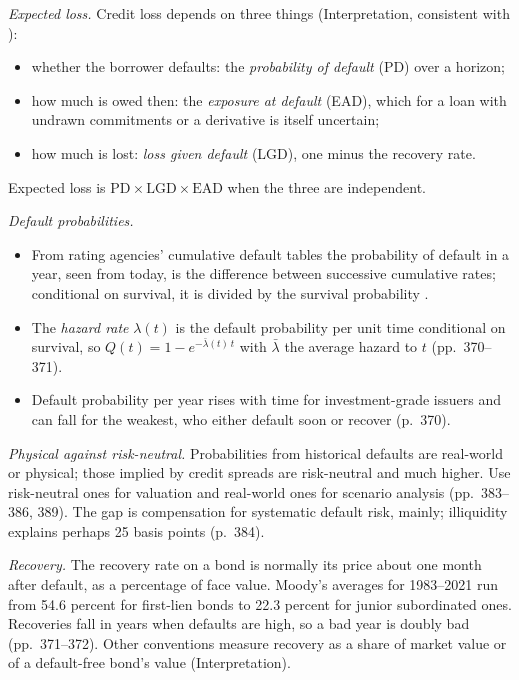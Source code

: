\begin{qfdefinition}\label{def:credit-risk-components}
 \emph{Expected loss.} Credit loss depends on three things (Interpretation, consistent with \citep[pp.~371--372, 395--396]{risk-management-financial-institutions-2023}):
\begin{itemize}
\item whether the borrower defaults: the \emph{probability of default} (PD) over a horizon;
\item how much is owed then: the \emph{exposure at default} (EAD), which for a loan with undrawn commitments or a derivative is itself uncertain;
\item how much is lost: \emph{loss given default} (LGD), one minus the recovery rate.
\end{itemize}
Expected loss is $\mathrm{PD}\times\mathrm{LGD}\times\mathrm{EAD}$ when the three are independent.

\emph{Default probabilities.}
\begin{itemize}
\item From rating agencies' cumulative default tables the probability of default in a year, seen from today, is the difference between successive cumulative rates; conditional on survival, it is divided by the survival probability \citep[pp.~369--370]{risk-management-financial-institutions-2023}.
\item The \emph{hazard rate} $\lambda(t)$ is the default probability per unit time conditional on survival, so $Q(t)=1-e^{-\bar\lambda(t)\,t}$ with $\bar\lambda$ the average hazard to $t$ (pp.~370--371).
\item Default probability per year rises with time for investment-grade issuers and can fall for the weakest, who either default soon or recover (p.~370).
\end{itemize}

\emph{Physical against risk-neutral.} Probabilities from historical defaults are real-world or physical; those implied by credit spreads are risk-neutral and much higher. Use risk-neutral ones for valuation and real-world ones for scenario analysis (pp.~383--386, 389). The gap is compensation for systematic default risk, mainly; illiquidity explains perhaps 25 basis points (p.~384).

\emph{Recovery.} The recovery rate on a bond is normally its price about one month after default, as a percentage of face value. Moody's averages for 1983--2021 run from 54.6 percent for first-lien bonds to 22.3 percent for junior subordinated ones. Recoveries fall in years when defaults are high, so a bad year is doubly bad (pp.~371--372). Other conventions measure recovery as a share of market value or of a default-free bond's value (Interpretation).


\end{qfdefinition}
